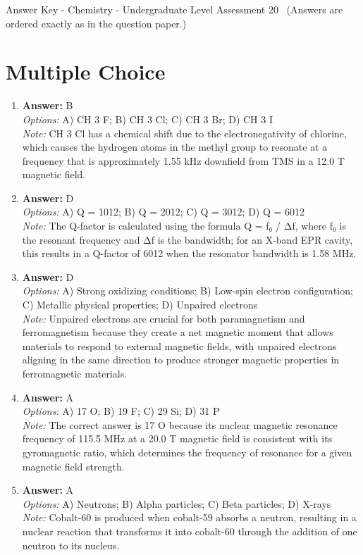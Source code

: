 \documentclass[12pt]{article}
\begin{document}
\begin{center}
Answer Key - Chemistry - Undergraduate Level Assessment 20 \
\small (Answers are ordered exactly as in the question paper.)
\end{center}

\section*{Multiple Choice}
\begin{enumerate}[label=\arabic*.]
\item \textbf{Answer:} B
\\ \textit{Options:} A) CH 3 F; B) CH 3 Cl; C) CH 3 Br; D) CH 3 I
\\ \textit{Note:} CH 3 Cl has a chemical shift due to the electronegativity of chlorine, which causes the hydrogen atoms in the methyl group to resonate at a frequency that is approximately 1.55 kHz downfield from TMS in a 12.0 T magnetic field.
\item \textbf{Answer:} D
\\ \textit{Options:} A) Q = 1012; B) Q = 2012; C) Q = 3012; D) Q = 6012
\\ \textit{Note:} The Q-factor is calculated using the formula Q = f₀ / Δf, where f₀ is the resonant frequency and Δf is the bandwidth; for an X-band EPR cavity, this results in a Q-factor of 6012 when the resonator bandwidth is 1.58 MHz.
\item \textbf{Answer:} D
\\ \textit{Options:} A) Strong oxidizing conditions; B) Low-spin electron configuration; C) Metallic physical properties; D) Unpaired electrons
\\ \textit{Note:} Unpaired electrons are crucial for both paramagnetism and ferromagnetism because they create a net magnetic moment that allows materials to respond to external magnetic fields, with unpaired electrons aligning in the same direction to produce stronger magnetic properties in ferromagnetic materials.
\item \textbf{Answer:} A
\\ \textit{Options:} A) 17 O; B) 19 F; C) 29 Si; D) 31 P
\\ \textit{Note:} The correct answer is 17 O because its nuclear magnetic resonance frequency of 115.5 MHz at a 20.0 T magnetic field is consistent with its gyromagnetic ratio, which determines the frequency of resonance for a given magnetic field strength.
\item \textbf{Answer:} A
\\ \textit{Options:} A) Neutrons; B) Alpha particles; C) Beta particles; D) X-rays
\\ \textit{Note:} Cobalt-60 is produced when cobalt-59 absorbs a neutron, resulting in a nuclear reaction that transforms it into cobalt-60 through the addition of one neutron to its nucleus.
\end{enumerate}
\end{document}
